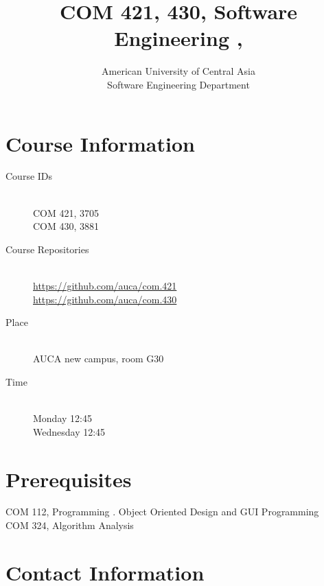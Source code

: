 \documentclass[12pt,a4paper,oneside]{article}
\newcommand{\R}[1]{\uppercase\expandafter{\romannumeral #1\relax}}
\begin{document}
    \title{COM 421, 430, Software Engineering \R{1}, \R{2}}
    \author{
        American University of Central Asia\\
        Software Engineering Department
    }
    \date{}
    \maketitle

    \section{Course Information}

        \begin{description}
            \item[Course IDs]\hfill\\
                COM 421, 3705\\
                COM 430, 3881
            \item[Course Repositories]\hfill\\
                \url{https://github.com/auca/com.421}\\
                \url{https://github.com/auca/com.430}
            \item[Place]\hfill\\
                AUCA new campus, room G30
            \item[Time]\hfill\\
                Monday 12:45\\
                Wednesday 12:45
        \end{description}

    \section{Prerequisites}

        COM 112, Programming \R{2}. Object Oriented Design and GUI Programming\\
        COM 324, Algorithm Analysis

        \section{Contact Information}
\end{document}
